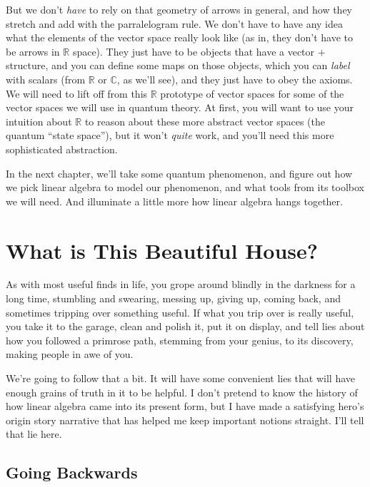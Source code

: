 \documentclass[
]{book}
\begin{document}
But we don't \emph{have} to rely on that geometry of arrows in general, and how they stretch and add with the parralelogram rule. We don't have to have any idea what the elements of the vector space really look like (as in, they don't have to be arrows in \(\mathbb{R}\) space). They just have to be objects that have a vector \(+\) structure, and you can define some maps on those objects, which you can \emph{label} with scalars (from \(\mathbb{R}\) or \(\mathbb{C}\), as we'll see), and they just have to obey the axioms. We will need to lift off from this \(\mathbb{R}\) prototype of vector spaces for some of the vector spaces we will use in quantum theory. At first, you will want to use your intuition about \(\mathbb{R}\) to reason about these more abstract vector spaces (the quantum ``state space''), but it won't \emph{quite} work, and you'll need this more sophisticated abstraction.

In the next chapter, we'll take some quantum phenomenon, and figure out how we pick linear algebra to model our phenomenon, and what tools from its toolbox we will need. And illuminate a little more how linear algebra hangs together.

\hypertarget{what-is-this-beautiful-house}{%
\chapter{What is This Beautiful House?}\label{what-is-this-beautiful-house}}

As with most useful finds in life, you grope around blindly in the darkness for a long time, stumbling and swearing, messing up, giving up, coming back, and sometimes tripping over something useful. If what you trip over is really useful, you take it to the garage, clean and polish it, put it on display, and tell lies about how you followed a primrose path, stemming from your genius, to its discovery, making people in awe of you.

We're going to follow that a bit. It will have some convenient lies that will have enough grains of truth in it to be helpful. I don't pretend to know the history of how linear algebra came into its present form, but I have made a satisfying hero's origin story narrative that has helped me keep important notions straight. I'll tell that lie here.

\hypertarget{going-backwards}{%
\section{Going Backwards}\label{going-backwards}}
\end{document}
